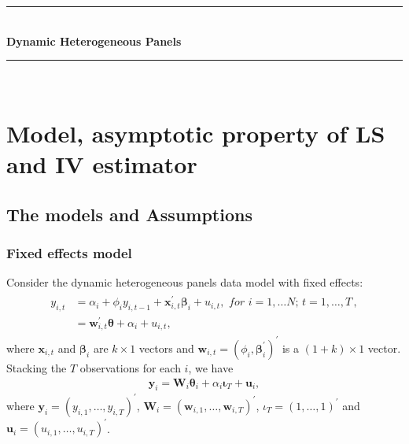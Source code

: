 \documentclass[12pt,a4paper,hyperref]{article}
\begin{document}
\begin{titlepage}

\newcommand{\HRule}{\rule{\linewidth}{0.5mm}} %

\center %



\HRule \\[0.4cm]
{ \huge \bfseries Dynamic Heterogeneous Panels }\\[0.4cm] %
\HRule \\[1.5cm]


\vfill %

\end{titlepage}

\newpage
\tableofcontents
\newpage
\section{Model, asymptotic property of LS and IV estimator}
\subsection{The models and Assumptions}
\subsubsection{Fixed effects model}
Consider the dynamic heterogeneous panels data model with fixed effects:
\begin{align}
\begin{split}
y_{i,t}&=\alpha_{i}+\phi_{i} y_{i,t-1}+ \boldsymbol{x}^{'}_{i,t}\boldsymbol{\beta}_{i}+u_{i,t}, \,\, for\,\,i=1,\ldots N;\,t=1,\ldots,T\, , \\
&= \boldsymbol{w}^{'}_{i,t}\boldsymbol{\theta}+ \alpha_{i}+u_{i,t}, \label{1}
\end{split}
\end{align}
where $\boldsymbol{x}_{i,t}$ and $\boldsymbol{\beta}_{i}$ are $k \times 1$ vectors and $\boldsymbol{w}_{i,t}=\left(\phi_{i}, \boldsymbol{\beta}^{'}_{i} \right)^{'}$ is a $\left(1+k\right) \times 1$ vector.
Stacking the $T$ observations for each $i$, we have
\begin{align}
\boldsymbol{y}_{i}=\boldsymbol{W}_{i}\boldsymbol{\theta}_{i}+ \alpha_{i}\boldsymbol{\iota}_{T}+ \boldsymbol{u}_{i}, \label{2}
\end{align}
where $\boldsymbol{y}_{i}=\left(y_{i,1},\ldots, y_{i,T} \right)^{'}$, $\boldsymbol{W}_{i}=\left(\boldsymbol{w}_{i,1},\ldots, \boldsymbol{w}_{i,T} \right)^{'}$, $\iota_{T}=\left(1,\ldots,1 \right)^{'}$ and $\boldsymbol{u}_{i}=\left(u_{i,1}, \ldots, u_{i,T} \right)^{'}$. 
\end{document}
